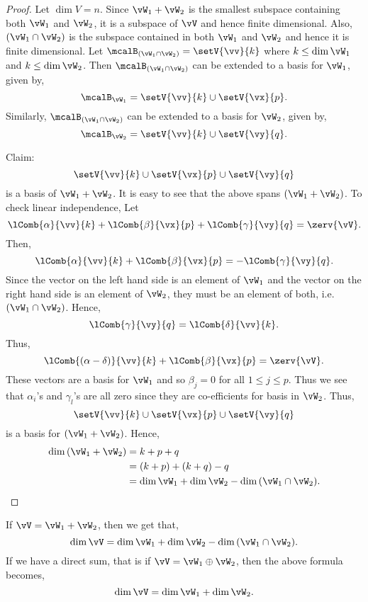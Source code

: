 \begin{proof}
    Let $\dim{V} = n$. 
    Since $\vW_{1} + \vW_{2}$ is the smallest subspace containing both $\vW_{1}$ and $\vW_{2}$, it is a
    subspace of $\vV$ and hence finite dimensional.
    Also, $(\vW_{1}\cap \vW_2)$ is the subspace contained in both $\vW_{1}$ and $\vW_{2}$ and hence it is
    finite dimensional. Let $\mcalB_{(\vW_{1}\cap \vW_2)} = \setV{\vv}{k}$ where $k \leq \dim{\vW_{1}}$ and
    $k \leq \dim{\vW_{2}}$.
    Then $\mcalB_{(\vW_{1}\cap \vW_2)}$ can be extended to a basis for $\vW_{1}$, given by,
    \[\mcalB_{\vW_{1}} = \setV{\vv}{k} \cup \setV{\vx}{p}.\]
    Similarly, 
    $\mcalB_{(\vW_{1}\cap \vW_2)}$ can be extended to a basis for $\vW_{2}$, given by,
    \[\mcalB_{\vW_{2}} = \setV{\vv}{k} \cup \setV{\vy}{q}.\]

    Claim:
    \[\setV{\vv}{k}\cup\setV{\vx}{p}\cup\setV{\vy}{q}\]
    is a basis of $\vW_{1} + \vW_{2}$.
    It is easy to see that the above spans $(\vW_{1} + \vW_{2})$. To check linear independence, 
    Let \[\lComb{\alpha}{\vv}{k} + \lComb{\beta}{\vx}{p} + \lComb{\gamma}{\vy}{q} = \zerv{\vV}.\]
    Then,
    \[\lComb{\alpha}{\vv}{k} + \lComb{\beta}{\vx}{p} = -\lComb{\gamma}{\vy}{q}. \]
    Since the vector on the left hand side is an element of $\vW_{1}$ and the vector on the right hand side is
    an element of $\vW_{2}$, they must be an element of both, i.e.~$(\vW_{1}\cap\vW_{2})$. Hence,
    \[\lComb{\gamma}{\vy}{q} = \lComb{\delta}{\vv}{k}.\]
    Thus,
    \[\lComb{(\alpha-\delta)}{\vv}{k} + \lComb{\beta}{\vx}{p} = \zerv{\vV}.\]
    These vectors are a basis for $\vW_{1}$ and so $\beta_j = 0$ for all $1 \leq j \leq p$. Thus we see that
    $\alpha_{i}$'s and $\gamma_{l}$'s are all zero since they are co-efficients for basis in $\vW_{2}$.
    Thus,
    \[\setV{\vv}{k}\cup\setV{\vx}{p}\cup\setV{\vy}{q}\]
    is a basis for $(\vW_{1} + \vW_{2})$.
    Hence,
    \begin{align*}
	\dim{(\vW_{1} + \vW_{2})} &= k + p + q \\
	& = (k + p) + (k + q) - q \\
	& = \dim{\vW_{1}} + \dim{\vW_{2}} - \dim{(\vW_{1}\cap\vW_{2})}.
    \end{align*}
\end{proof}
\begin{Remark}
    If $\vV = \vW_{1} + \vW_{2}$, then we get that,
    \[\dim{\vV} = \dim{\vW_{1}} + \dim{\vW_{2}} - \dim{(\vW_{1}\cap\vW_{2})}.\]
    If we have a direct sum, that is if $\vV = \vW_{1} \oplus \vW_{2}$, then the above formula becomes,
    \[\dim{\vV} = \dim{\vW_{1}} + \dim{\vW_{2}}.\]
\end{Remark}

